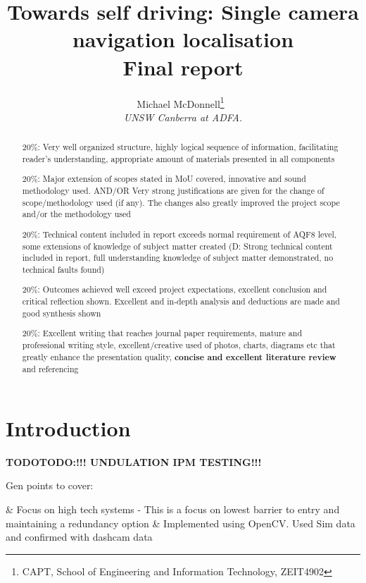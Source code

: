 \documentclass[]{aiaa-tc}%
\title{Towards self driving: Single camera navigation localisation\\ Final report}
\author{
  Michael McDonnell\thanks{CAPT, School of Engineering and Information Technology, ZEIT4902}\
  \\
  {\normalsize\itshape
   UNSW Canberra at ADFA.}\\
  }
\begin{document}
\maketitle


\begin{abstract}
20\%: Very well organized structure, highly logical sequence of information, facilitating reader’s understanding, appropriate amount of materials presented in all components

20\%: Major extension of scopes stated in MoU covered, innovative and sound methodology used. AND/OR Very strong justifications are given for the change of scope/methodology used (if any). The changes also greatly improved the project scope and/or the methodology used

20\%: Technical content included in report exceeds normal requirement of AQF8 level, some extensions of knowledge of subject matter created
(D: Strong technical content included in report, full understanding knowledge of subject matter demonstrated, no technical faults found)

20\%: Outcomes achieved well exceed project expectations, excellent conclusion and critical reflection shown. Excellent and in‐depth analysis and deductions are made and good synthesis shown

20\%: Excellent writing that reaches journal paper requirements, mature and professional writing style, excellent/creative used of photos, charts, diagrams etc that greatly enhance the presentation quality, \textbf{concise and excellent literature review }and referencing
\end{abstract}


\newpage
\section{Introduction} \label{sect:intro}
\textbf{TODOTODO:!!! UNDULATION IPM TESTING!!!}

Gen points to cover:
\begin{easylist}
	& Focus on high tech systems - This is a focus on lowest barrier to entry and maintaining a redundancy option
	& Implemented using OpenCV. Used Sim data and confirmed with dashcam data
\end{easylist}
\end{document}
